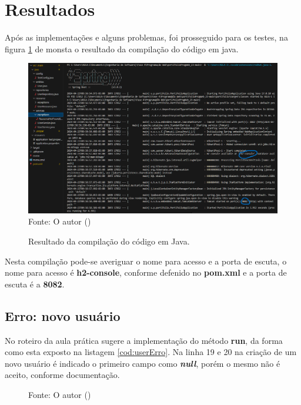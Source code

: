 \section{Resultados}
\par Após as implementações e alguns problemas, foi prosseguido para os testes, na figura \ref{fig:com} de monsta o resultado da compilação do código em java.

\begin{figure}[H]
\center
  \caption{Resultado da compilação do código em Java.}
  \includegraphics[scale=.45]{figure/resultado da compilação.png}
  \label{fig:com}
  \flushleft %
    {\fontsize{10pt}{\baselineskip}\selectfont
    Fonte: O autor (\the\year) }
\end{figure}

\par Nesta compilação pode-se averiguar o nome para acesso e a porta de escuta, o nome para acesso é \textbf{h2-console}, conforme defenido no \textbf{pom.xml} e a porta de escuta é a \textbf{8082}.


\subsection{Erro: novo usuário}

\par No roteiro da aula prática sugere a implementação do método \textbf{run}, da forma como esta exposto na listagem \ref{cod:userErro}. Na linha 19 e 20 na criação de um novo usuário é indicado o primeiro campo como \textit{\textbf{null}}, porém o mesmo não é aceito, conforme documentação.

\begin{figure}[H]
  \flushleft %
    {\fontsize{10pt}{\baselineskip}\selectfont  Fonte: O autor (\the\year) }
\end{figure}

